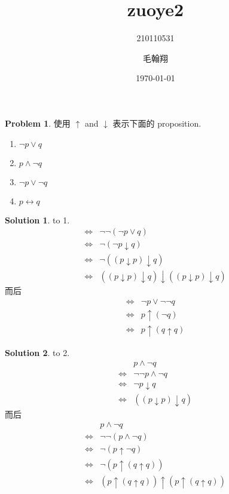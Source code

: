 \documentclass[12pt, a4paper]{ctexart} %
\title{zuoye2}
\author{210110531\and 毛翰翔}
\date{\today}
\theoremstyle{plain}
\theoremstyle{definition}
\newtheorem{problem}{Problem}
\newtheorem*{solution}{Solution}
\def\downa{\downarrow}
\def\upa{\uparrow}
\def\lra{\Leftrightarrow}
\begin{document}
\maketitle
\begin{problem}
    使用 $\uparrow$ and $\downarrow$ 表示下面的 proposition.
    \begin{enumerate}
        \item $\neg p \lor q$
        \item $p \wedge \neg q$
        \item $\neg p \lor \neg q$
        \item $p \leftrightarrow q$
    \end{enumerate}
\end{problem}
\begin{solution} to 1.
        \begin{align*}
            \lra & \neg \neg \left( \neg p \lor q\right) \\ 
            \lra & \neg \left( \neg p \downa q\right)\\
            \lra & \neg \left(  \left( p \downa p\right) \downa q\right) \\
            \lra & \left( \left( p \downa p\right) \downa q \right) \downa \left( \left( p \downa p \right) \downa q\right)
        \end{align*}
        而后   
        \begin{align*}
            \lra & \neg p \vee \neg \neg q \\
            \lra & p \upa \left( \neg q\right)\\
            \lra & p \upa \left( q \upa q\right)
        \end{align*}
\end{solution}
\begin{solution} to 2.
        \begin{align*}
            & p \wedge \neg q\\
            \lra & \neg \neg p \wedge \neg q\\
            \lra & \neg p \downa q \\
            \lra & \left( \left( p \downa p\right) \downa q\right)
        \end{align*}
        而后 
        \begin{align*}
            & p \wedge \neg q \\
            \lra & \neg \neg \left( p \wedge \neg q\right) \\
            \lra & \neg \left( p \upa  \neg q\right)\\
            \lra & \neg \left( p \upa \left(q \upa q\right)\right)\\
            \lra & \left(p \upa \left(q \upa q\right)\right) \upa \left( p \upa \left( q \upa q\right)\right)\\
        \end{align*}
\end{solution}
\end{document}

